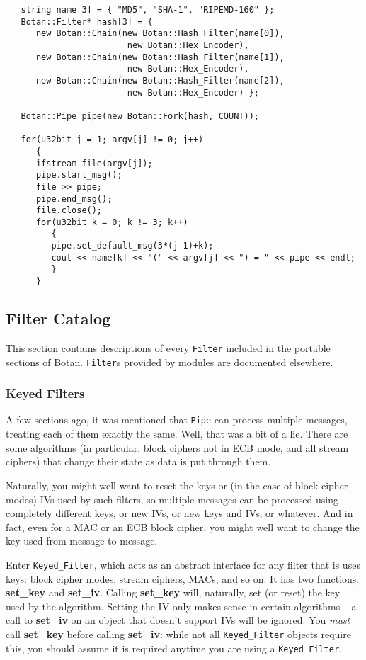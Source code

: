 \documentclass{article}
\newcommand{\function}[1]{\textbf{#1}}
\newcommand{\type}[1]{\texttt{#1}}
\begin{document}
\begin{verbatim}
   string name[3] = { "MD5", "SHA-1", "RIPEMD-160" };
   Botan::Filter* hash[3] = {
      new Botan::Chain(new Botan::Hash_Filter(name[0]),
                        new Botan::Hex_Encoder),
      new Botan::Chain(new Botan::Hash_Filter(name[1]),
                        new Botan::Hex_Encoder),
      new Botan::Chain(new Botan::Hash_Filter(name[2]),
                        new Botan::Hex_Encoder) };

   Botan::Pipe pipe(new Botan::Fork(hash, COUNT));

   for(u32bit j = 1; argv[j] != 0; j++)
      {
      ifstream file(argv[j]);
      pipe.start_msg();
      file >> pipe;
      pipe.end_msg();
      file.close();
      for(u32bit k = 0; k != 3; k++)
         {
         pipe.set_default_msg(3*(j-1)+k);
         cout << name[k] << "(" << argv[j] << ") = " << pipe << endl;
         }
      }
\end{verbatim}


\subsection{Filter Catalog}

This section contains descriptions of every \type{Filter} included in
the portable sections of Botan. \type{Filter}s provided by modules
are documented elsewhere.

\subsubsection{Keyed Filters}

A few sections ago, it was mentioned that \type{Pipe} can process multiple
messages, treating each of them exactly the same. Well, that was a bit of a
lie. There are some algorithms (in particular, block ciphers not in ECB mode,
and all stream ciphers) that change their state as data is put through them.

Naturally, you might well want to reset the keys or (in the case of block
cipher modes) IVs used by such filters, so multiple messages can be processed
using completely different keys, or new IVs, or new keys and IVs, or whatever.
And in fact, even for a MAC or an ECB block cipher, you might well want to
change the key used from message to message.

Enter \type{Keyed\_Filter}, which acts as an abstract interface for
any filter that is uses keys: block cipher modes, stream ciphers,
MACs, and so on. It has two functions, \function{set\_key} and
\function{set\_iv}. Calling \function{set\_key} will, naturally, set
(or reset) the key used by the algorithm. Setting the IV only makes
sense in certain algorithms -- a call to \function{set\_iv} on an
object that doesn't support IVs will be ignored. You \emph{must} call
\function{set\_key} before calling \function{set\_iv}: while not all
\type{Keyed\_Filter} objects require this, you should assume it is
required anytime you are using a \type{Keyed\_Filter}.
\end{document}
